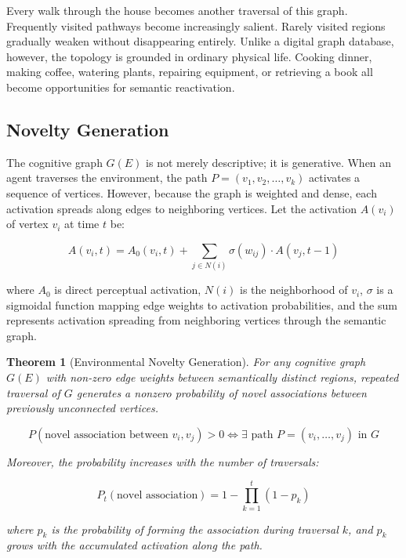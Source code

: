 \documentclass[12pt,oneside]{article}
\newtheorem{theorem}[definition]{Theorem}
\theoremstyle{remark}
\begin{document}
Every walk through the house becomes another traversal of this graph. Frequently visited pathways become increasingly salient. Rarely visited regions gradually weaken without disappearing entirely. Unlike a digital graph database, however, the topology is grounded in ordinary physical life. Cooking dinner, making coffee, watering plants, repairing equipment, or retrieving a book all become opportunities for semantic reactivation.

\subsection{Novelty Generation}

The cognitive graph $G(E)$ is not merely descriptive; it is generative. When an agent traverses the environment, the path $P = (v_1, v_2, \ldots, v_k)$ activates a sequence of vertices. However, because the graph is weighted and dense, each activation spreads along edges to neighboring vertices. Let the activation $A(v_i)$ of vertex $v_i$ at time $t$ be:

\begin{equation}
A(v_i, t) = A_0(v_i, t) + \sum_{j \in N(i)} \sigma(w_{ij}) \cdot A(v_j, t-1)
\end{equation}

where $A_0$ is direct perceptual activation, $N(i)$ is the neighborhood of $v_i$, $\sigma$ is a sigmoidal function mapping edge weights to activation probabilities, and the sum represents activation spreading from neighboring vertices through the semantic graph.

\begin{theorem}[Environmental Novelty Generation]
For any cognitive graph $G(E)$ with non-zero edge weights between semantically distinct regions, repeated traversal of $G$ generates a nonzero probability of novel associations between previously unconnected vertices.

\begin{equation}
P(\text{novel association between } v_i, v_j) > 0 \iff \exists \text{ path } P = (v_i, \ldots, v_j) \text{ in } G
\end{equation}

Moreover, the probability increases with the number of traversals:

\begin{equation}
P_t(\text{novel association}) = 1 - \prod_{k=1}^{t} (1 - p_k)
\end{equation}

where $p_k$ is the probability of forming the association during traversal $k$, and $p_k$ grows with the accumulated activation along the path.
\end{theorem}
\end{document}
